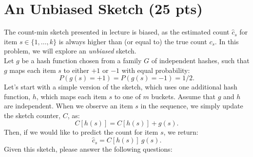 \documentclass{exam}
\begin{document}
\newpage
\section{An Unbiased Sketch (25 pts)}
  The count-min sketch presented in lecture is {biased}, as the estimated count $\hat{c}_s$ for item $s \in \{1,\ldots,k\}$ is always
  higher than (or equal to) the true count $c_s$. In this problem,
  we will explore an \textit{unbiased} sketch.  \\

\noindent Let
  $g$ be a hash function chosen from a family $G$ of independent
  hashes, such that $g$ maps each item $s$ to either $+1$ or $-1$ with
  equal probability:
 \[
 P(g(s) = +1) = P(g(s) = -1) = 1/2. 
 \]
 Let's start with a simple version of the sketch, which uses one additional hash function, $h$, which maps each item $s$ to one of $m$ buckets. 
Assume that $g$ and $h$ are independent. When we observe an item $s$ in the
sequence, we simply update the sketch counter, $C$, as:
\[
C[h(s)] =C[h(s)] + g(s).
\]
Then, if we would like to predict the count for item $s$,
we return:
\[
\hat{c}_s = C[h(s)] \  g(s).
\]
Given this sketch, please answer the following questions:
\end{document}
